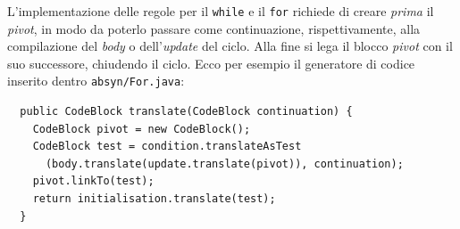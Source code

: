 L'implementazione delle regole
per il \texttt{while} e il \texttt{for} richiede di creare
\emph{prima} il \textit{pivot}, in modo da poterlo passare come continuazione,
rispettivamente, alla compilazione del \textit{body} o
dell'\textit{update} del ciclo. Alla fine si lega il blocco \textit{pivot} con
il suo successore, chiudendo il ciclo. Ecco per esempio il generatore di codice
inserito dentro \texttt{absyn/For.java}:
%
\begin{verbatim}
  public CodeBlock translate(CodeBlock continuation) {
    CodeBlock pivot = new CodeBlock();
    CodeBlock test = condition.translateAsTest
      (body.translate(update.translate(pivot)), continuation);
    pivot.linkTo(test);
    return initialisation.translate(test);
  }
\end{verbatim}

